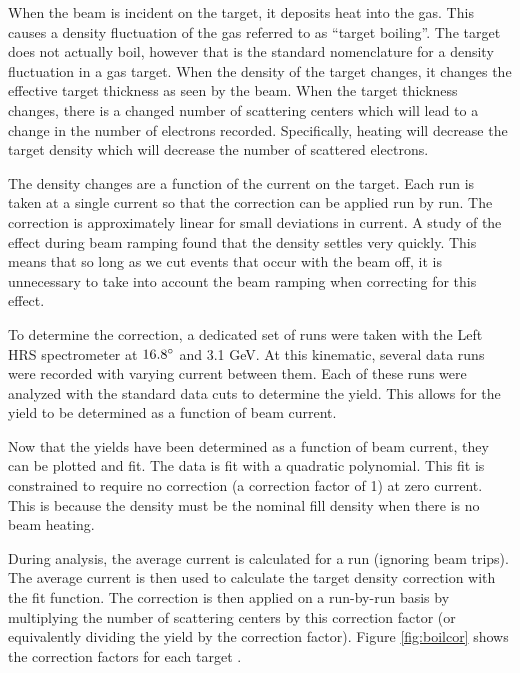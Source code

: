 When the beam is incident on the target, it deposits heat into the gas. This causes a density fluctuation of the gas referred to as ``target boiling''. The target does not actually boil, however that is the standard nomenclature for a density fluctuation in a gas target. When the density of the target changes, it changes the effective target thickness as seen by the beam. When the target thickness changes, there is a changed number of scattering centers which will lead to a change in the number of electrons recorded. Specifically, heating will decrease the target density which will decrease the number of scattered electrons.

The density changes are a function of the current on the target. Each run is taken at a single current so that the correction can be applied run by run. The correction is approximately linear for small deviations in current. A study of the effect during beam ramping found that the density settles very quickly. This means that so long as we cut events that occur with the beam off, it is unnecessary to take into account the beam ramping when correcting for this effect.

To determine the correction, a dedicated set of runs were taken with the Left HRS spectrometer at $16.8\degree$ and 3.1 GeV. At this kinematic, several data runs were recorded with varying current between them. Each of these runs were analyzed with the standard data cuts to determine the yield. This allows for the yield to be determined as a function of beam current.

Now that the yields have been determined as a function of beam current, they can be plotted and fit. The data is fit with a quadratic polynomial. This fit is constrained to require no correction (a correction factor of 1) at zero current. This is because the density must be the nominal fill density when there is no beam heating.


During analysis, the average current is calculated for a run (ignoring beam trips). The average current is then used to calculate the target density correction with the fit function. The correction is then applied on a run-by-run basis by multiplying the number of scattering centers by this correction factor (or equivalently dividing the yield by the correction factor). Figure \ref{fig:boilcor} shows the correction factors for each target \cite{boiling}.

